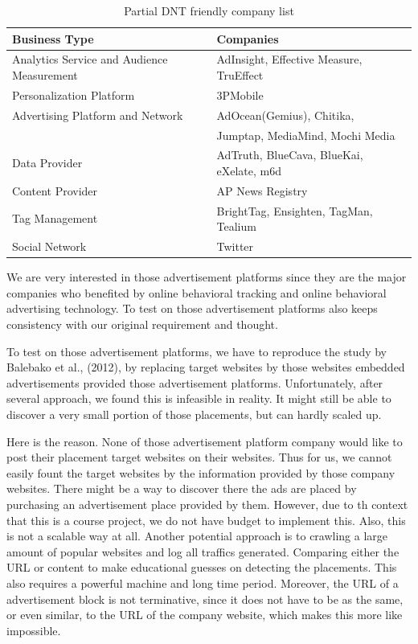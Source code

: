 \documentclass{sig-alternate}
\begin{document}
\begin{table}
\footnotesize
\begin{tabular}{ll}
\toprule
Business Type&Companies\\
\midrule
Analytics Service and Audience Measurement&AdInsight, Effective Measure, TruEffect\\ \hline
\addlinespace
Personalization Platform&3PMobile\\ \hline
\addlinespace
Advertising Platform and Network&AdOcean(Gemius), Chitika,\\& Jumptap, MediaMind, Mochi Media\\ \hline
\addlinespace
Data Provider&AdTruth, BlueCava, BlueKai, eXelate, m6d\\ \hline
\addlinespace
Content Provider&AP News Registry\\ \hline
\addlinespace
Tag Management&BrightTag, Ensighten, TagMan, Tealium\\ \hline
\addlinespace
Social Network&Twitter\\
\bottomrule
\end{tabular}
\caption{Partial DNT friendly company list}
\label{table:dntlist}
\end{table}

We are very interested in those advertisement platforms since they are the major companies who benefited by online behavioral tracking and online behavioral advertising technology. To test on those advertisement platforms also keeps consistency with our original requirement and thought.

To test on those advertisement platforms, we have to reproduce the study by Balebako et al., (2012), by replacing target websites by those websites embedded advertisements provided those advertisement platforms. Unfortunately, after several approach, we found this is infeasible in reality. It might still be able to discover a very small portion of those placements, but can hardly scaled up.

Here is the reason. None of those advertisement platform company would like to post their placement target websites on their websites. Thus for us, we cannot easily fount the target websites by the information provided by those company websites. There might be a way to discover there the ads are placed by purchasing an advertisement place provided by them. However, due to th context that this is a course project, we do not have budget to implement this. Also, this is not a scalable way at all. Another potential approach is to crawling a large amount of popular websites and log all traffics generated. Comparing either the URL or content to make educational guesses on detecting the placements. This also requires a powerful machine and long time period. Moreover, the URL of a advertisement block is not terminative, since it does not have to be as the same, or even similar, to the URL of the company website, which makes this more like impossible.
\end{document}
